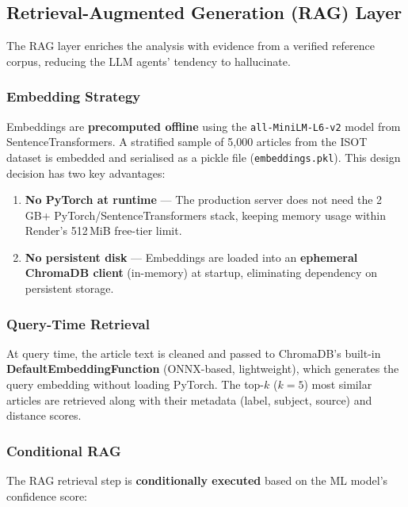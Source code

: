 \documentclass[12pt, a4paper]{article}
\begin{document}
\subsection{Retrieval-Augmented Generation (RAG) Layer}

The RAG layer enriches the analysis with evidence from a verified reference
corpus, reducing the LLM agents' tendency to hallucinate.

\subsubsection{Embedding Strategy}

Embeddings are \textbf{precomputed offline} using the
\texttt{all-MiniLM-L6-v2} model from SentenceTransformers. A stratified
sample of 5{,}000 articles from the ISOT dataset is embedded and serialised
as a pickle file (\texttt{embeddings.pkl}). This design decision has two
key advantages:

\begin{enumerate}[leftmargin=2em]
    \item \textbf{No PyTorch at runtime} --- The production server does not
          need the 2\,GB+ PyTorch/SentenceTransformers stack, keeping memory
          usage within Render's 512\,MiB free-tier limit.
    \item \textbf{No persistent disk} --- Embeddings are loaded into an
          \textbf{ephemeral ChromaDB client} (in-memory) at startup,
          eliminating dependency on persistent storage.
\end{enumerate}

\subsubsection{Query-Time Retrieval}

At query time, the article text is cleaned and passed to ChromaDB's
built-in \textbf{DefaultEmbeddingFunction} (ONNX-based, lightweight), which
generates the query embedding without loading PyTorch. The top-$k$
($k{=}5$) most similar articles are retrieved along with their metadata
(label, subject, source) and distance scores.

\subsubsection{Conditional RAG}

The RAG retrieval step is \textbf{conditionally executed} based on the ML
model's confidence score:
\end{document}
